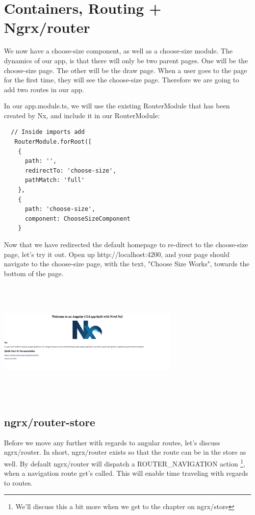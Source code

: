 
\section{ Containers, Routing + Ngrx/router }

We now have a choose-size component, as well as a choose-size module.
The dynamics of our app, is that there will only be two parent pages. One will
be the choose-size page. The other will be the draw page. When a user goes to
the page for the first time, they will see the choose-size page. Therefore we
are going to add two routes in our app.

In our app.module.ts, we will use the existing RouterModule that has been
created by Nx, and include it in our RouterModule:

\begin{verbatim}
  // Inside imports add
   RouterModule.forRoot([
    {
      path: '',
      redirectTo: 'choose-size',
      pathMatch: 'full'
    },
    {
      path: 'choose-size',
      component: ChooseSizeComponent
    }
\end{verbatim}

Now that we have redirected the default homepage to re-direct to the
choose-size page, let's try it out. Open up http://localhost:4200, and your page
should navigate to the choose-size page, with the text, "Choose Size Works",
towards the bottom of the page.

\includegraphics[width=9cm, height=6.1cm]{routing/containers-and-routing/choose-size-screenshot}

\subsection{ ngrx/router-store }

Before we move any further with regards to angular routes, let's discuss
ngrx/router. In short, ngrx/router exists so that the route can be in the store
as well. By default ngrx/router will dispatch a ROUTER\_NAVIGATION action
\footnote{We'll discuss this a bit more when we get to the chapter on ngrx/store},
when a navigation route get's called. This will enable time traveling with
regards to routes.

